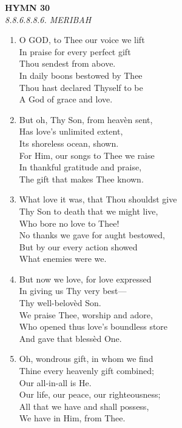 \newpage
\begin{center}
    {\Large \textbf{HYMN 30}}
    \\
    \textit{8.8.6.8.8.6. MERIBAH}
\end{center}
\vspace{1em}

\begin{enumerate}
    \item O GOD, to Thee our voice we lift \\
        In praise for every perfect gift \\
        Thou sendest from above. \\
        In daily boons bestowed by Thee \\
        Thou hast declared Thyself to be \\
        A God of grace and love.

    \item But oh, Thy Son, from heav\`en sent, \\
        Has love's unlimited extent, \\
        Its shoreless ocean, shown. \\
        For Him, our songs to Thee we raise \\
        In thankful gratitude and praise, \\
        The gift that makes Thee known.

    \item What love it was, that Thou shouldst give \\
        Thy Son to death that we might live, \\
        Who bore no love to Thee! \\
        No thanks we gave for aught bestowed, \\
        But by our every action showed \\
        What enemies were we.

    \item But now we love, for love expressed \\
        In giving us Thy very best--- \\
        Thy well-belov\`ed Son. \\
        We praise Thee, worship and adore, \\
        Who opened thus love's boundless store \\
        And gave that bless\`ed One.

    \item Oh, wondrous gift, in whom we find \\
        Thine every heavenly gift combined; \\
        Our all-in-all is He. \\
        Our life, our peace, our righteousness; \\
        All that we have and shall possess, \\
        We have in Him, from Thee.


\end{enumerate}
